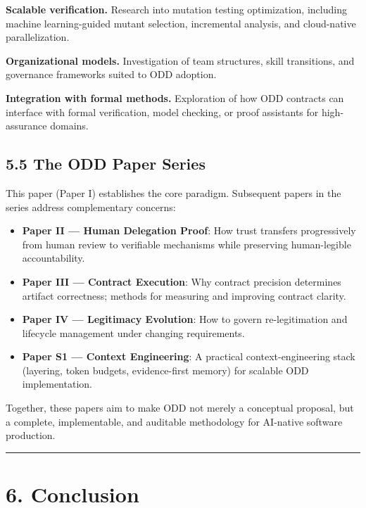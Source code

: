 \documentclass[
]{article}
\begin{document}
\textbf{Scalable verification.} Research into mutation testing
optimization, including machine learning-guided mutant selection,
incremental analysis, and cloud-native parallelization.

\textbf{Organizational models.} Investigation of team structures, skill
transitions, and governance frameworks suited to ODD adoption.

\textbf{Integration with formal methods.} Exploration of how ODD
contracts can interface with formal verification, model checking, or
proof assistants for high-assurance domains.

\hypertarget{55-the-odd-paper-series}{%
\subsection{5.5 The ODD Paper Series}\label{55-the-odd-paper-series}}

This paper (Paper I) establishes the core paradigm. Subsequent papers in
the series address complementary concerns:

\begin{itemize}
\item
  \textbf{Paper II --- Human Delegation Proof}: How trust transfers
  progressively from human review to verifiable mechanisms while
  preserving human-legible accountability.
\item
  \textbf{Paper III --- Contract Execution}: Why contract precision
  determines artifact correctness; methods for measuring and improving
  contract clarity.
\item
  \textbf{Paper IV --- Legitimacy Evolution}: How to govern
  re-legitimation and lifecycle management under changing requirements.
\item
  \textbf{Paper S1 --- Context Engineering}: A practical
  context-engineering stack (layering, token budgets, evidence-first
  memory) for scalable ODD implementation.
\end{itemize}

Together, these papers aim to make ODD not merely a conceptual proposal,
but a complete, implementable, and auditable methodology for AI-native
software production.

\begin{center}\rule{0.5\linewidth}{0.5pt}\end{center}

\hypertarget{6-conclusion}{%
\section{6. Conclusion}\label{6-conclusion}}
\end{document}
